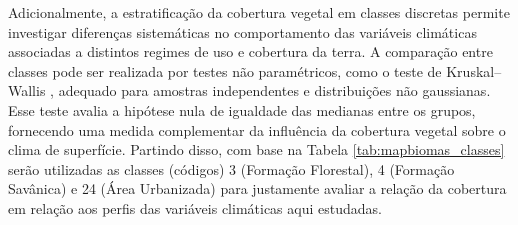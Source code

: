 Adicionalmente, a estratificação da cobertura vegetal em classes discretas permite investigar diferenças sistemáticas no comportamento das variáveis climáticas associadas a distintos regimes de uso e cobertura da terra. A comparação entre classes pode ser realizada por testes não paramétricos, como o teste de Kruskal--Wallis \citep{kruskal1952}, adequado para amostras independentes e distribuições não gaussianas. Esse teste avalia a hipótese nula de igualdade das medianas entre os grupos, fornecendo uma medida complementar da influência da cobertura vegetal sobre o clima de superfície. Partindo disso, com base na Tabela \ref{tab:mapbiomas_classes} serão utilizadas as classes (códigos) 3 (Formação Florestal), 4 (Formação Savânica) e 24 (Área Urbanizada) para justamente avaliar a relação da cobertura em relação aos perfis das variáveis climáticas aqui estudadas.
